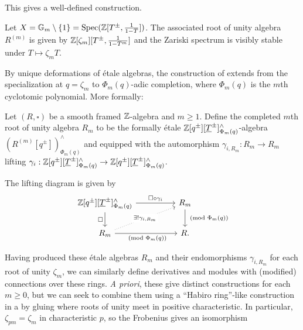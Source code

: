 This gives a well-defined construction. 
\begin{example}
    Let $X=\mathbb{G}_{m}\setminus\{1\}=\operatorname{Spec}(\mathbb{Z}[T^{\pm},\frac{1}{1-T}])$. The associated root of unity algebra $R^{(m)}$ is given by $\mathbb{Z}[\zeta_{m}][T^{\pm},\frac{1}{1-T^{m}}]$ and the Zariski spectrum is visibly stable under $T\mapsto \zeta_{m}T$. 
\end{example}
By unique deformations of \'{e}tale algebras, the construction of  extends from the specialization at $q=\zeta_{m}$ to $\Phi_{m}(q)$-adic completion, where $\Phi_{m}(q)$ is the $m$th cyclotomic polynomial. More formally: 
\begin{definition}\label{def: completed root of unity algebra}
    Let $(R,\square)$ be a smooth framed $\mathbb{Z}$-algebra and $m\geq 1$. Define the completed $m$th root of unity algebra $R_{m}$ to be the formally \'{e}tale $\mathbb{Z}[q^{\pm}][\underline{T}^{\pm}]^{\wedge}_{\Phi_{m}(q)}$-algebra $(R^{(m)}[q^{\pm}])_{\Phi_{m}(q)}^{\wedge}$ and equipped with the automorphism $\gamma_{i,R_{m}}:R_{m}\to R_{m}$ lifting $\gamma_{i}:\mathbb{Z}[q^{\pm}][\underline{T}^{\pm}]^{\wedge}_{\Phi_{m}(q)}\to\mathbb{Z}[q^{\pm}][\underline{T}^{\pm}]^{\wedge}_{\Phi_{m}(q)}$. 
\end{definition}
\begin{remark}
    The lifting diagram is given by 
    $$%
    \begin{tikzcd}
        {\ZZ[q^{\pm}][\underline{T}^{\pm}]^{\wedge}_{\Phi_{m}(q)}} && {R_{m}} \\
        {R_{m}} && {R.}
        \arrow["{\square\circ\gamma_{i}}", from=1-1, to=1-3]
        \arrow["\square"', from=1-1, to=2-1]
        \arrow["{\pmod{\Phi_{m}(q)}}", from=1-3, to=2-3]
        \arrow["{\exists!\gamma_{i,R_{m}}}"{description}, dotted, from=2-1, to=1-3]
        \arrow["{\pmod{\Phi_{m}(q)}}"', from=2-1, to=2-3]
    \end{tikzcd}$$
\end{remark}
Having produced these \'{e}tale algebras $R_{m}$ and their endomorphisms $\gamma_{i,R_{m}}$ for each root of unity $\zeta_{m}$, we can similarly define derivatives and modules with (modified) connections over these rings. \emph{A priori}, these give distinct constructions for each $m\geq0$, but we can seek to combine them using a ``Habiro ring''-like construction in a by gluing where roots of unity meet in positive characteristic. In particular, $\zeta_{pm}=\zeta_{m}$ in characteristic $p$, so the Frobenius gives an isomorphism 
